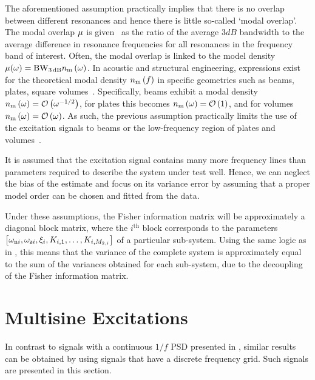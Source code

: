 \begin{remark}
The aforementioned assumption practically implies that there is no overlap between different resonances and hence there is little so-called `modal overlap'.
The modal overlap $\modalOverlap$ is given~\citep{Ege2009} as the ratio of the average $3\unit{dB}$ bandwidth to the average difference in resonance frequencies for all resonances in the frequency band of interest.
Often, the modal overlap is linked to the model density $\modalOverlap(\omega) = \wdB \modalDensity{\omega}$.
In acoustic and structural engineering, expressions exist for the theoretical modal density $\modalDensity{f}$ in specific geometries such as beams, plates, square volumes~\citep{Hart1971,Bies2009}.
Specifically, beams exhibit a modal density $\modalDensity{\omega} = \bigO{\omega^{-1/2}}$, for plates this becomes $\modalDensity{\omega} = \bigO{1}$, and for volumes $\modalDensity{\omega} = \bigO{\omega}$.
As such, the previous assumption practically limits the use of the excitation signals to beams or the low-frequency region of plates and volumes~\citep{Ege2009}.
\end{remark}

\begin{assumption}
It is assumed that the excitation signal contains many more frequency lines than parameters required to describe the system under test well.
Hence, we can neglect the bias of the estimate and focus on its variance error by assuming that a proper model order can be chosen and fitted from the data.
\end{assumption}

Under these assumptions, the Fisher information matrix will be approximately a diagonal block matrix, where the $i^{\text{th}}$ block corresponds to the parameters $\left[\wn[i], \wz[i], \damping[i], \dc[i,1], \ldots, \dc[i,M_{2,i}] \right]$ of a particular sub-system.
Using the same logic as in , this means that the variance of the complete system is approximately equal to the sum of the variances obtained for each sub-system, due to the decoupling of the Fisher information matrix.

\section{Multisine Excitations}
\label{sec:excitation:multisine}
In contrast to signals with a continuous $1/f$ \gls{PSD} presented in , similar results can be obtained by using signals that have a discrete frequency grid.
Such signals are presented in this section.


